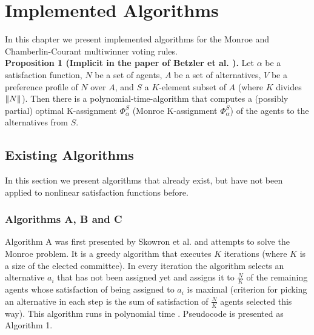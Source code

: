 \chapter{Implemented Algorithms}
\label{cha:implementedAlgorithms}

In this chapter we present implemented algorithms for the Monroe and Chamberlin-Courant multiwinner voting rules.
\\

\noindent
\textbf{Proposition 1 (Implicit in the paper of Betzler et al. \cite{3}).} Let $\alpha$ be a satisfaction function, $N$ be a set of agents, $A$ be a set of alternatives, $V$ be a preference profile of $N$ over $A$, and $S$ a $K$-element subset of $A$ (where $K$ divides $\lVert N\rVert$). Then there is a polynomial-time-algorithm that computes a (possibly partial) optimal K-assignment $\Phi^{S}_{\alpha}$ (Monroe K-assignment $\Phi^{S}_{\alpha}$) of the agents to the alternatives from $S$.
\\

\section{Existing Algorithms}

In this section we present algorithms that already exist, but have not been applied to nonlinear satisfaction functions before.

\subsection{Algorithms A, B and C}

Algorithm A was first presented by Skowron et al. \cite{1} and attempts to solve the Monroe problem. It is a greedy algorithm that executes $K$ iterations (where $K$ is a size of the elected committee). In every iteration the algorithm selects an alternative $a_{i}$ that has not been assigned yet and assigns it to $\frac{N}{K}$ of the remaining agents whose satisfaction of being assigned to $a_{i}$ is maximal (criterion for picking an alternative in each step is the sum of satisfaction of $\frac{N}{K}$ agents selected this way). This algorithm runs in polynomial time \cite{1}. Pseudocode is presented as Algorithm 1.
\\

